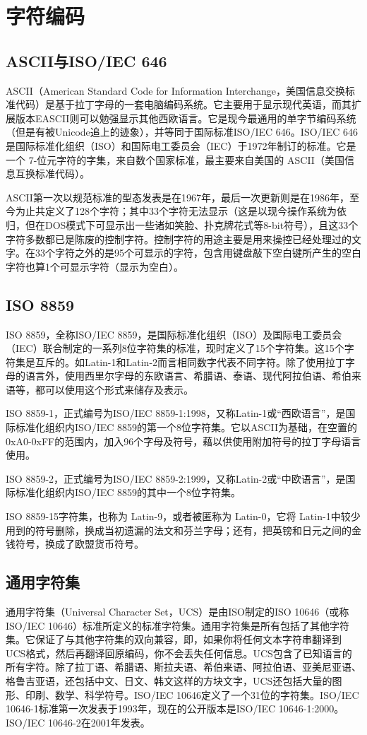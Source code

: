 \section{字符编码}

\subsection{ASCII与ISO/IEC 646}
ASCII（American Standard Code for Information Interchange，美国信息交换标准代码）是基于拉丁字母的一套电脑编码系统。它主要用于显示现代英语，而其扩展版本EASCII则可以勉强显示其他西欧语言。它是现今最通用的单字节编码系统（但是有被Unicode追上的迹象），并等同于国际标准ISO/IEC 646。ISO/IEC 646是国际标准化组织（ISO）和国际电工委员会（IEC）于1972年制订的标准。它是一个 7-位元字符的字集，来自数个国家标准，最主要来自美国的 ASCII（美国信息互换标准代码）。

ASCII第一次以规范标准的型态发表是在1967年，最后一次更新则是在1986年，至今为止共定义了128个字符；其中33个字符无法显示（这是以现今操作系统为依归，但在DOS模式下可显示出一些诸如笑脸、扑克牌花式等8-bit符号），且这33个字符多数都已是陈废的控制字符。控制字符的用途主要是用来操控已经处理过的文字。在33个字符之外的是95个可显示的字符，包含用键盘敲下空白键所产生的空白字符也算1个可显示字符（显示为空白）。

\subsection{ISO 8859}
ISO 8859，全称ISO/IEC 8859，是国际标准化组织（ISO）及国际电工委员会（IEC）联合制定的一系列8位字符集的标准，现时定义了15个字符集。这15个字符集是互斥的。如Latin-1和Latin-2而言相同数字代表不同字符。除了使用拉丁字母的语言外，使用西里尔字母的东欧语言、希腊语、泰语、现代阿拉伯语、希伯来语等，都可以使用这个形式来储存及表示。

ISO 8859-1，正式编号为ISO/IEC 8859-1:1998，又称Latin-1或“西欧语言”，是国际标准化组织内ISO/IEC 8859的第一个8位字符集。它以ASCII为基础，在空置的0xA0-0xFF的范围内，加入96个字母及符号，藉以供使用附加符号的拉丁字母语言使用。

ISO 8859-2，正式编号为ISO/IEC 8859-2:1999，又称Latin-2或“中欧语言”，是国际标准化组织内ISO/IEC 8859的其中一个8位字符集。

ISO 8859-15字符集，也称为 Latin-9，或者被匿称为 Latin-0，它将 Latin-1中较少用到的符号删除，换成当初遗漏的法文和芬兰字母；还有，把英镑和日元之间的金钱符号，换成了欧盟货币符号。

\subsection{通用字符集}
通用字符集（Universal Character Set，UCS）是由ISO制定的ISO 10646（或称ISO/IEC 10646）标准所定义的标准字符集。通用字符集是所有包括了其他字符集。它保证了与其他字符集的双向兼容，即，如果你将任何文本字符串翻译到UCS格式，然后再翻译回原编码，你不会丢失任何信息。UCS包含了已知语言的所有字符。除了拉丁语、希腊语、斯拉夫语、希伯来语、阿拉伯语、亚美尼亚语、格鲁吉亚语，还包括中文、日文、韩文这样的方块文字，UCS还包括大量的图形、印刷、数学、科学符号。ISO/IEC 10646定义了一个31位的字符集。ISO/IEC 10646-1标准第一次发表于1993年，现在的公开版本是ISO/IEC 10646-1:2000。ISO/IEC 10646-2在2001年发表。

